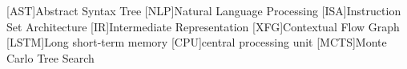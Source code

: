 \begin{acronym}[MCTS]\itemsep0pt
[AST]{Abstract Syntax Tree}
[NLP]{Natural Language Processing}
[ISA]{Instruction Set Architecture}
[IR]{Intermediate Representation}
[XFG]{Contextual Flow Graph}
[LSTM]{Long short-term memory}
[CPU]{central processing unit}
[MCTS]{Monte Carlo Tree Search}
\end{acronym}
